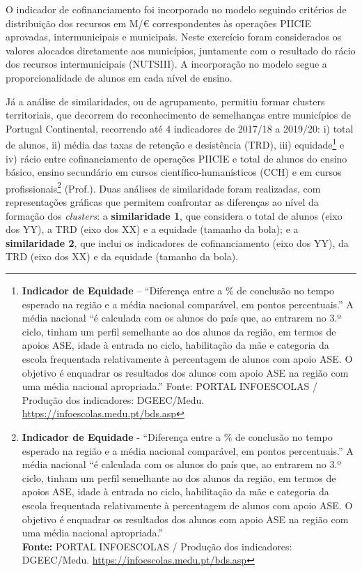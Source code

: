 \documentclass[
]{book}
\begin{document}
O indicador de cofinanciamento foi incorporado no modelo seguindo critérios de distribuição dos recursos em M/€ correspondentes às operações PIICIE aprovadas, intermunicipais e municipais. Neste exercício foram considerados os valores alocados diretamente aos municípios, juntamente com o resultado do rácio dos recursos intermunicipais (NUTSIII). A incorporação no modelo segue a proporcionalidade de alunos em cada nível de ensino.

Já a análise de similaridades, ou de agrupamento, permitiu formar clusters territoriais, que decorrem do reconhecimento de semelhanças entre municípios de Portugal Continental, recorrendo até 4 indicadores de 2017/18 a 2019/20: i) total de alunos, ii) média das taxas de retenção e desistência (TRD), iii) equidade\footnote{\textbf{Indicador de Equidade} -- ``Diferença entre a \% de conclusão no tempo esperado na região e a média nacional comparável, em pontos percentuais.'' A média nacional ``é calculada com os alunos do país que, ao entrarem no 3.º ciclo, tinham um perfil semelhante ao dos alunos da região, em termos de apoios ASE, idade à entrada no ciclo, habilitação da mãe e categoria da escola frequentada relativamente à percentagem de alunos com apoio ASE. O objetivo é enquadrar os resultados dos alunos com apoio ASE na região com uma média nacional apropriada.'' Fonte: PORTAL INFOESCOLAS / Produção dos indicadores: DGEEC/Medu. \url{https://infoescolas.medu.pt/bds.asp}} e iv) rácio entre cofinanciamento de operações PIICIE e total de alunos do ensino básico, ensino secundário em cursos científico-humanísticos (CCH) e em cursos profissionais\footnote{\textbf{Indicador de Equidade} - ``Diferença entre a \% de conclusão no tempo esperado na região e a média nacional comparável, em pontos percentuais.'' A média nacional ``é calculada com os alunos do país que, ao entrarem no 3.º ciclo, tinham um perfil semelhante ao dos alunos da região, em termos de apoios ASE, idade à entrada no ciclo, habilitação da mãe e categoria da escola frequentada relativamente à percentagem de alunos com apoio ASE. O objetivo é enquadrar os resultados dos alunos com apoio ASE na região com uma média nacional apropriada.''\\
  \textbf{Fonte:} PORTAL INFOESCOLAS / Produção dos indicadores: DGEEC/Medu. \url{https://infoescolas.medu.pt/bds.asp}} (Prof.). Duas análises de similaridade foram realizadas, com representações gráficas que permitem confrontar as diferenças ao nível da formação dos \emph{clusters}: a \textbf{similaridade 1}, que considera o total de alunos (eixo dos YY), a TRD (eixo dos XX) e a equidade (tamanho da bola); e a \textbf{similaridade 2}, que inclui os indicadores de cofinanciamento (eixo dos YY), da TRD (eixo dos XX) e da equidade (tamanho da bola).
\end{document}
